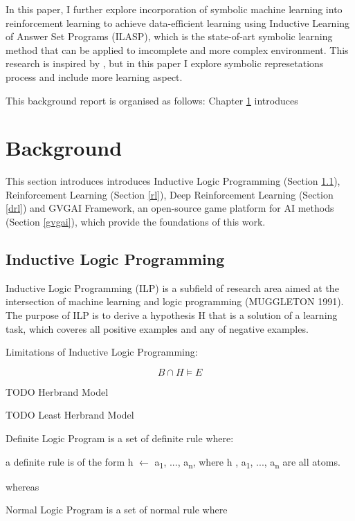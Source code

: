 \documentclass[12pt,twoside]{report}
\begin{document}
In this paper, I further explore incorporation of symbolic machine learning into reinforcement learning to achieve data-efficient learning using Inductive Learning of Answer Set Programs (ILASP), which is the state-of-art symbolic learning method that can be applied to imcomplete and more complex environment.
This research is inspired by \cite{garnelo2016towards}, but in this paper I explore symbolic represetations process and include more learning aspect.

This background report is organised as follows: Chapter \ref{background} introduces

\chapter{Background}
\label{background}

This section introduces introduces Inductive Logic Programming (Section \ref{ilp}), Reinforcement Learning (Section \ref{rl}), Deep Reinforcement Learning (Section \ref{drl}) and GVGAI Framework, an open-source game platform for AI methods (Section \ref{gvgai}), which provide the foundations of this work.

\section{Inductive Logic Programming}
\label{ilp}
Inductive Logic Programming (ILP) is a subfield of research area aimed at the intersection of machine learning and logic programming (MUGGLETON 1991). The purpose of ILP is to derive a hypothesis H that is a solution of a learning task, which coveres all positive examples and any of negative examples.

Limitations of Inductive Logic Programming:

\begin{equation}
B \cap H \models E
\end{equation}

TODO Herbrand Model

TODO Least Herbrand Model

Definite Logic Program is a set of definite rule where: \newline

a definite rule is of the form h $\leftarrow$ a\textsubscript{1}, ..., a\textsubscript{n}, where h , a\textsubscript{1}, ..., a\textsubscript{n} are all atoms.

whereas

Normal Logic Program is a set of normal rule where
\end{document}
